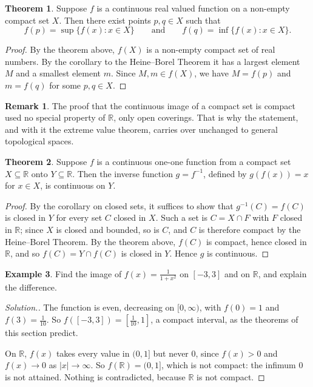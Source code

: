 \documentclass[11pt,a4paper]{article}
\numberwithin{equation}{section}
\theoremstyle{definition}
\newtheorem{thm}{Theorem}[subsection]
\newtheorem{exa}[thm]{Example}
\newtheorem*{remark}{Remark}
\newenvironment{solution}
  {\renewcommand{\qedsymbol}{}\begin{proof}[\textit{Solution}.]}
  {\end{proof}}
\begin{document}
\begin{thm}
Suppose $f$ is a continuous real valued function on a non-empty compact set $X$. Then there exist points $p, q\in X$ such that
$$f(p) = \sup \{ f(x): x \in X\} \qquad\text{and}\qquad f(q) = \inf \{f(x): x\in X\}.$$
\end{thm}

\begin{proof}
By the theorem above, $f(X)$ is a non-empty compact set of real numbers. By the corollary to the Heine--Borel Theorem it has a largest element $M$ and a smallest element $m$. Since $M,m\in f(X)$, we have $M = f(p)$ and $m = f(q)$ for some $p, q\in X$.
\end{proof}

\begin{remark}
The proof that the continuous image of a compact set is compact used no special property of $\mathbb{R}$, only open coverings. That is why the statement, and with it the extreme value theorem, carries over unchanged to general topological spaces.
\end{remark}


\begin{thm}
Suppose $f$ is a continuous one-one function from a compact set $X\subseteq \mathbb{R}$ onto $Y\subseteq \mathbb{R}$. Then the inverse function $g = f^{-1}$, defined by $g(f(x)) = x$ for $x\in X$, is continuous on $Y$.
\end{thm}

\begin{proof}
By the corollary on closed sets, it suffices to show that $g^{-1}(C) = f(C)$ is closed in $Y$ for every set $C$ closed in $X$. Such a set is $C = X\cap F$ with $F$ closed in $\mathbb{R}$; since $X$ is closed and bounded, so is $C$, and $C$ is therefore compact by the Heine--Borel Theorem. By the theorem above, $f(C)$ is compact, hence closed in $\mathbb{R}$, and so $f(C) = Y\cap f(C)$ is closed in $Y$. Hence $g$ is continuous.
\end{proof}

\begin{exa}
Find the image of $f(x) = \frac{1}{1+x^2}$ on $[-3,3]$ and on $\mathbb{R}$, and explain the difference.
\end{exa}

\begin{solution}
The function is even, decreasing on $[0,\infty)$, with $f(0) = 1$ and $f(3) = \frac{1}{10}$. So $f([-3,3]) = \left[\frac{1}{10},1\right]$, a compact interval, as the theorems of this section predict.

On $\mathbb{R}$, $f(x)$ takes every value in $(0,1]$ but never $0$, since $f(x)>0$ and $f(x)\longrightarrow 0$ as $|x|\longrightarrow\infty$. So $f(\mathbb{R}) = (0,1]$, which is not compact: the infimum $0$ is not attained. Nothing is contradicted, because $\mathbb{R}$ is not compact.
\end{solution}
\end{document}
